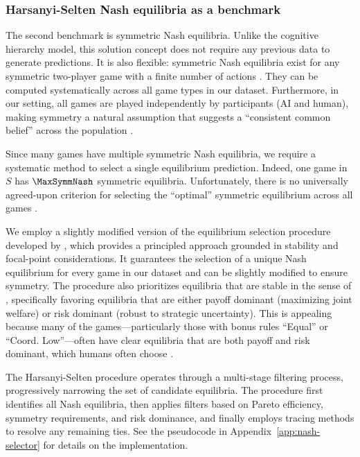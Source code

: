 \subsubsection{Harsanyi-Selten Nash equilibria as a benchmark}

The second benchmark is symmetric Nash equilibria.
Unlike the cognitive hierarchy model, this solution concept does not require any previous data to generate predictions.
It is also flexible: symmetric Nash equilibria exist for any symmetric two-player game with a finite number of actions \citep{nash1951noncooperative}.
They can be computed systematically across all game types in our dataset.
Furthermore, in our setting, all games are played independently by participants (AI and human), making symmetry a natural assumption that suggests a ``consistent common belief'' across the population \citep{STAHL1994}.

Since many games have multiple symmetric Nash equilibria, we require a systematic method to select a single equilibrium prediction. 
Indeed, one game in $S$ has $\MaxSymmNash$ symmetric equilibria. 
Unfortunately, there is no universally agreed-upon criterion for selecting the ``optimal'' symmetric equilibrium across all games \citep{camerer2003behavioral, tadelis2013game}.

We employ a slightly modified version of the equilibrium selection procedure developed by \citet{HarsanyiSelten1988}, which provides a principled approach grounded in stability and focal-point considerations. 
It guarantees the selection of a unique Nash equilibrium for every game in our dataset and can be slightly modified to ensure symmetry. 
The procedure also prioritizes equilibria that are stable in the sense of \citet{schelling1960strategy}, specifically favoring equilibria that are either payoff dominant (maximizing joint welfare) or risk dominant (robust to strategic uncertainty). 
This is appealing because many of the games---particularly those with bonus rules ``Equal'' or ``Coord. Low''---often have clear equilibria that are both payoff and risk dominant, which humans often choose \citep{camerer2003behavioral}. 

The Harsanyi-Selten procedure operates through a multi-stage filtering process, progressively narrowing the set of candidate equilibria. 
The procedure first identifies all Nash equilibria, then applies filters based on Pareto efficiency, symmetry requirements, and risk dominance, and finally employs tracing methods to resolve any remaining ties. 
See the pseudocode in Appendix~\ref{app:nash-selector} for details on the implementation.

